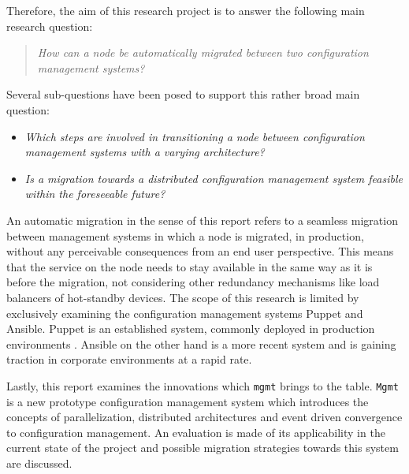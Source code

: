 Therefore, the aim of this research project is to answer the following main research question:

\begin{quote}
\textit{How can a node be automatically migrated between two configuration management systems?}
\end{quote}

\noindent
Several sub-questions have been posed to support this rather broad main question:

\begin{itemize}
	\setlength\itemsep{1pt}
    \item \textit{Which steps are involved in transitioning a node between configuration management systems with a varying architecture?}
    \item \textit{Is a migration towards a distributed configuration management system feasible within the foreseeable future?}
\end{itemize}

\noindent
An automatic migration in the sense of this report refers to a seamless migration between management systems in which a node is migrated, in production, without any perceivable consequences from an end user perspective. This means that the service on the node needs to stay available in the same way as it is before the migration, not considering other redundancy mechanisms like load balancers of hot-standby devices. The scope of this research is limited by exclusively examining the configuration management systems Puppet and Ansible. Puppet is an established system, commonly deployed in production environments \cite{tecosystems_2013}. Ansible on the other hand is a more recent system and is gaining traction in corporate environments at a rapid rate.

Lastly, this report examines the innovations which \texttt{mgmt} brings to the table. \texttt{Mgmt} is a new prototype configuration management system which introduces the concepts of parallelization, distributed architectures and event driven convergence to configuration management. An evaluation is made of its applicability in the current state of the project and possible migration strategies towards this system are discussed.
